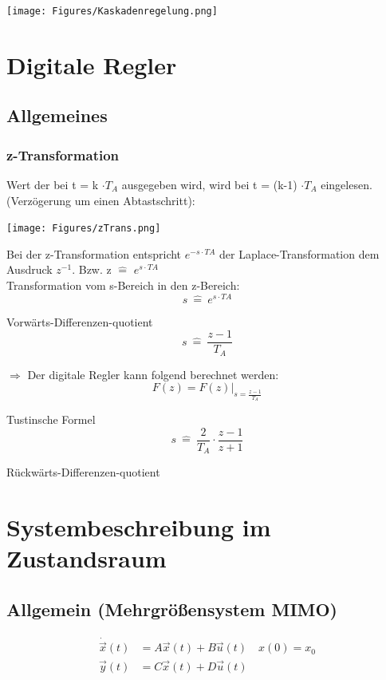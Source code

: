 \documentclass[10pt,a4paper]{article}
\begin{document}
\texttt{[image: Figures/Kaskadenregelung.png]}

\newpage
\section{Digitale Regler}
\subsection{Allgemeines}
\subsubsection{z-Transformation}

Wert der bei t = k $\cdot T_A$ ausgegeben wird, wird bei t = (k-1) $\cdot T_A$
eingelesen. (Verzögerung um einen Abtastschritt):

\texttt{[image: Figures/zTrans.png]}

Bei der z-Transformation entspricht $e^{-s \cdot TA}$ der
Laplace-Transformation dem Ausdruck $z^{-1}$. Bzw. z $\hat{=}$ $e^{s \cdot
			TA}$\\ Transformation vom s-Bereich in den z-Bereich:
\[
	s \ \hat{=}\  e^{s \cdot TA}
\]

Vorwärts-Differenzen-quotient
\[
	s \ \hat{=} \ \frac{z-1}{T_A}
\]

$\Rightarrow$ Der digitale Regler kann folgend berechnet werden:
\[
	F(z) = F(z)|_{s= \frac {z-1}{T_A}}
\]

Tustinsche Formel
\[
	s \ \hat{=} \ \frac{2}{T_A} \cdot \frac{z-1}{z+1}
\]

Rückwärts-Differenzen-quotient

\section{Systembeschreibung im Zustandsraum}
\subsection{Allgemein (Mehrgrößensystem MIMO) }
\begin{mdframed}[style=exercise]
	\vspace{-1em}
	\begin{align*}
		\dot{\Vec{x}}(t) & = A\vec{x}(t) + B\vec{u}(t) \quad x(0) = x_{0} \\
		\vec{y}(t)       & = C\vec{x}(t) + D\vec{u}(t)
	\end{align*}
\end{mdframed}
\end{document}
